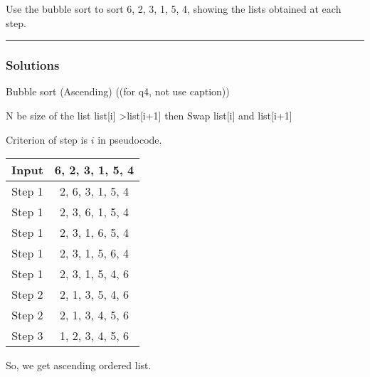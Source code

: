\begin{question}
Use the bubble sort to sort 6, 2, 3, 1, 5, 4, showing the lists obtained at each step.
\end{question}

\par\noindent\rule{\textwidth}{0.5pt}

\subsubsection*{Solutions}


Bubble sort (Ascending) \small{((for q4, not use caption))}
\begin{algorithm}
    \begin{algorithmic}
    \State N be size of the list
            \If list[i] \textgreater list[i+1] then
                \State Swap list[i] and list[i+1]
            \EndIf
        \EndFor
    \EndFor
    \end{algorithmic}
\end{algorithm}

Criterion of step is $i$ in pseudocode.

\begin{tabular}{|c|c|}
    \hline
    Input & 6, 2, 3, 1, 5, 4\\
    \hline
    Step 1& 2, 6, 3, 1, 5, 4\\
    Step 1& 2, 3, 6, 1, 5, 4\\
    Step 1& 2, 3, 1, 6, 5, 4\\
    Step 1& 2, 3, 1, 5, 6, 4\\
    Step 1& 2, 3, 1, 5, 4, 6\\
    \hline
    Step 2& 2, 1, 3, 5, 4, 6\\
    Step 2& 2, 1, 3, 4, 5, 6\\
    \hline
    Step 3& 1, 2, 3, 4, 5, 6\\
    \hline
\end{tabular}

\medskip
So, we get ascending ordered list.